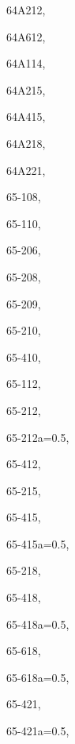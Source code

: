 \documentclass[11pt]{book}
\begin{document}
\begin{theindex}
 \item 64A212, \hyperref[s64A212]{\pageref{s64A212}}
 \item 64A612, \hyperref[s64A612]{\pageref{s64A612}}
 \item 64A114, \hyperref[s64A114]{\pageref{s64A114}}
 \item 64A215, \hyperref[s64A215]{\pageref{s64A215}}
 \item 64A415, \hyperref[s64A415]{\pageref{s64A415}}
 \item 64A218, \hyperref[s64A218]{\pageref{s64A218}}
 \item 64A221, \hyperref[s64A221]{\pageref{s64A221}}
 \item 65-108, \hyperref[s65-108]{\pageref{s65-108}}
 \item 65-110, \hyperref[s65-110]{\pageref{s65-110}}
 \item 65-206, \hyperref[s65-206]{\pageref{s65-206}}
 \item 65-208, \hyperref[s65-208]{\pageref{s65-208}}
 \item 65-209, \hyperref[s65-209]{\pageref{s65-209}}
 \item 65-210, \hyperref[s65-210]{\pageref{s65-210}}
 \item 65-410, \hyperref[s65-410]{\pageref{s65-210}}
 \item 65-112, \hyperref[s65-112]{\pageref{s65-112}}
 \item 65-212, \hyperref[s65-212]{\pageref{s65-212}}
 \item 65-212a=0.5, \hyperref[s65-212a=0.5]{\pageref{s65-212a=0.5}}
 \item 65-412, \hyperref[s65-412]{\pageref{s65-412}}
 \item 65-215, \hyperref[s65-215]{\pageref{s65-215}}
 \item 65-415, \hyperref[s65-415]{\pageref{s65-415}}
 \item 65-415a=0.5, \hyperref[s65-415a=0.5]{\pageref{s65-415a=0.5}}
 \item 65-218, \hyperref[s65-218]{\pageref{s65-218}}
 \item 65-418, \hyperref[s65-418]{\pageref{s65-418}}
 \item 65-418a=0.5, \hyperref[s65-418a=0.5]{\pageref{s65-418a=0.5}}
 \item 65-618, \hyperref[s65-618]{\pageref{s65-618}}
 \item 65-618a=0.5, \hyperref[s65-618a=0.5]{\pageref{s65-618a=0.5}}
 \item 65-421, \hyperref[s65-421]{\pageref{s65-421}}
 \item 65-421a=0.5, \hyperref[s65-421a=0.5]{\pageref{s65-421a=0.5}}

\end{theindex}
\end{document}
